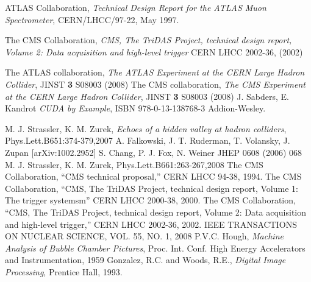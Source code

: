 \documentclass{JINST}
\begin{document}
\begin{thebibliography}{9}

ATLAS Collaboration,
\textsl{Technical Design Report for the ATLAS Muon Spectrometer},
CERN/LHCC/97-22, May 1997.

 The CMS Collaboration, 
\emph{CMS, The TriDAS Project, technical design report, Volume 2: Data acquisition and high-level trigger}
CERN LHCC 2002-36, (2002)

The ATLAS collaboration,
\emph{The ATLAS Experiment at the CERN Large Hadron Collider},
JINST {\textbf 3}  S08003 (2008)
%
The CMS collaboration,
\emph{The CMS Experiment at the CERN Large Hadron Collider},
JINST {\textbf 3}  S08003 (2008)
%
J. Sabders, E. Kandrot 
\emph{CUDA by Example},
ISBN 978-0-13-138768-3 Addion-Wesley.

M. J. Strassler, K. M. Zurek, 
\emph{Echoes of a hidden valley at hadron colliders},
Phys.Lett.B651:374-379,2007 
%
 A. Falkowski, J. T. Ruderman, T. Volansky, J. Zupan [arXiv:1002.2952]
%
 S. Chang, P. J. Fox, N. Weiner JHEP 0608 (2006) 068
%
  M. J. Strassler, K. M. Zurek, Phys.Lett.B661:263-267,2008
%
%
 The CMS Collaboration, “CMS technical proposal,” CERN LHCC 94-38, 1994.
%
%
 The CMS Collaboration, “CMS, The TriDAS Project, technical design
report, Volume 1: The trigger systemsm” CERN LHCC 2000-38, 2000.
%
%
 The CMS Collaboration, “CMS, The TriDAS Project, technical design
report, Volume 2: Data acquisition and high-level trigger,” CERN LHCC 2002-36, 2002.
%
%
 IEEE TRANSACTIONS ON NUCLEAR SCIENCE, VOL. 55, NO. 1, 2008
%
%
P.V.C. Hough, 
\emph{Machine Analysis of Bubble Chamber Pictures}, 
Proc. Int. Conf. High Energy Accelerators and Instrumentation, 1959
%
%
 Gonzalez, R.C. and Woods, R.E., 
\emph{Digital Image Processing},
Prentice Hall, 1993.

\end{thebibliography}
\end{document}
